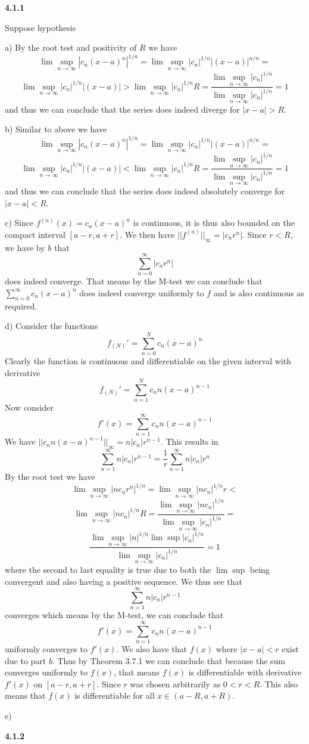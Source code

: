 \documentclass[12pt]{article}
\begin{document}
\textbf{4.1.1}

Suppose hypothesis

a) By the root test and positivity of $ R$ we have 
\[\lim\sup_{n\to\infty}|c_{n}(x-a)^{n}|^{1/n} =\lim\sup_{n\to\infty}|c_{n}|^{1/n}|(x-a)|^{n/n}=\] \[\lim\sup_{n\to\infty}|c_{n}|^{1/n}|(x-a)| > \lim\sup_{n\to\infty}|c_{n}|^{1/n}R =\frac{\lim\sup_{n\to\infty}|c_{n}|^{1/n}}{\lim\sup_{n\to\infty}|c_{n}|^{1/n}} = 1\] and thus we can conclude that the series does indeed diverge for $ |x-a| > R$. 

b) Similar to above we have
\[\lim\sup_{n\to\infty}|c_{n}(x-a)^{n}|^{1/n} =\lim\sup_{n\to\infty}|c_{n}|^{1/n}|(x-a)|^{n/n}=\] \[\lim\sup_{n\to\infty}|c_{n}|^{1/n}|(x-a)| < \lim\sup_{n\to\infty}|c_{n}|^{1/n}R =\frac{\lim\sup_{n\to\infty}|c_{n}|^{1/n}}{\lim\sup_{n\to\infty}|c_{n}|^{1/n}} = 1\] and thus we can conclude that the series  does indeed absolutely converge for $ |x-a| < R$.

c) Since $f^{(n)}(x) = c_n(x-a)^n$ is continuous, it is thus also bounded on the compact interval $[a-r,a+r]$.
We then have $||f^{(n)}||_{\infty} = |c_nr^n|$. Since $ r<R$, we have by $b$ that 
\[\sum_{n=0}^\infty|c_nr^n|\] does indeed converge. That means by the M-test we can conclude that $ \sum_{n=0}^\infty c_n(x-a)^n$ does indeed converge uniformly to $f$ and is also continuous as required.

d) Consider the functions 
\[f_{(N)}' = \sum_{n=0}^N c_n(x-a)^n\] Clearly the function is continuous and differentiable on the given interval with derivative
\[f_{(N)}' = \sum_{n=1}^Nc_n n(x-a)^{n-1}\] Now consider
\[f'(x) = \sum_{n=1}^\infty c_n n(x-a)^{n-1}\] 
We have $||c_nn(x-a)^{n-1}||_\infty = n|c_n|r^{n-1}$. This results in
\[\sum_{n=1}^\infty n|c_n|r^{n-1} =\frac{1}{r}\sum_{n=1}^\infty n|c_n|r^{n}  \] By the root test we have
\[\lim\sup_{n\to\infty}|nc_nr^n|^{1/n} =\lim\sup_{n\to\infty}|nc_n|^{1/n}r <\]  \[\lim\sup_{n\to\infty}|nc_n|^{1/n}R =\frac{\lim\sup_{n\to\infty}|nc_n|^{1/n}}{\lim\sup_{n\to\infty}|c_n|^{1/n}} =\]  \[\frac{\lim\sup_{n\to\infty}|n|^{1/n}\lim\sup|c_n|^{1/n}}{\lim\sup_{n\to\infty}|c_n|^{1/n}} = 1\] where the second to last equality is true due to both the $\lim\sup$ being convergent and also having a positive sequence. We thus see that 
\[\sum_{n=1}^\infty n|c_n|r^{n-1}\] converges which means by the M-test, we can conclude that 
\[f'(x) = \sum_{n=1}^\infty c_n n(x-a)^{n-1}\] uniformly converges to $f'(x)$. We also have that $f(x)$ where $|x-a| < r$ exist due to part $b$. Thus by Theorem 3.7.1 we can conclude that because the sum converges uniformly to $f(x)$, that means $f(x)$ is differentiable with derivative $f'(x)$ on $[a-r,a+r]$. Since $ r$ was chosen arbitrarily as $ 0<r<R$. This also means that $f(x)$ is differentiable for all $x\in (a-R,a+R)$.

e)

\textbf{4.1.2}
\end{document}
